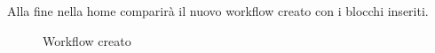 \newpage
Alla fine nella home comparirà il nuovo workflow creato con i blocchi inseriti.
\begin{figure}[!ht]
	\centering
	\caption{Workflow creato}\label{workflow}
\end{figure}

